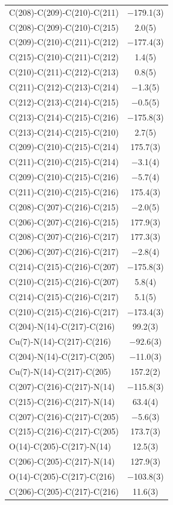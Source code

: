 \begin{center}
{\begin{supertabular}{p{1.8in}c}
C(208)-C(209)-C(210)-C(211)&$-$179.1(3)\\
C(208)-C(209)-C(210)-C(215)&2.0(5)\\
C(209)-C(210)-C(211)-C(212)&$-$177.4(3)\\
C(215)-C(210)-C(211)-C(212)&1.4(5)\\
C(210)-C(211)-C(212)-C(213)&0.8(5)\\
C(211)-C(212)-C(213)-C(214)&$-$1.3(5)\\
C(212)-C(213)-C(214)-C(215)&$-$0.5(5)\\
C(213)-C(214)-C(215)-C(216)&$-$175.8(3)\\
C(213)-C(214)-C(215)-C(210)&2.7(5)\\
C(209)-C(210)-C(215)-C(214)&175.7(3)\\
C(211)-C(210)-C(215)-C(214)&$-$3.1(4)\\
C(209)-C(210)-C(215)-C(216)&$-$5.7(4)\\
C(211)-C(210)-C(215)-C(216)&175.4(3)\\
C(208)-C(207)-C(216)-C(215)&$-$2.0(5)\\
C(206)-C(207)-C(216)-C(215)&177.9(3)\\
C(208)-C(207)-C(216)-C(217)&177.3(3)\\
C(206)-C(207)-C(216)-C(217)&$-$2.8(4)\\
C(214)-C(215)-C(216)-C(207)&$-$175.8(3)\\
C(210)-C(215)-C(216)-C(207)&5.8(4)\\
C(214)-C(215)-C(216)-C(217)&5.1(5)\\
C(210)-C(215)-C(216)-C(217)&$-$173.4(3)\\
C(204)-N(14)-C(217)-C(216)&99.2(3)\\
Cu(7)-N(14)-C(217)-C(216)&$-$92.6(3)\\
C(204)-N(14)-C(217)-C(205)&$-$11.0(3)\\
Cu(7)-N(14)-C(217)-C(205)&157.2(2)\\
C(207)-C(216)-C(217)-N(14)&$-$115.8(3)\\
C(215)-C(216)-C(217)-N(14)&63.4(4)\\
C(207)-C(216)-C(217)-C(205)&$-$5.6(3)\\
C(215)-C(216)-C(217)-C(205)&173.7(3)\\
O(14)-C(205)-C(217)-N(14)&12.5(3)\\
C(206)-C(205)-C(217)-N(14)&127.9(3)\\
O(14)-C(205)-C(217)-C(216)&$-$103.8(3)\\
C(206)-C(205)-C(217)-C(216)&11.6(3)\\

\end{supertabular}}
\end{center}
